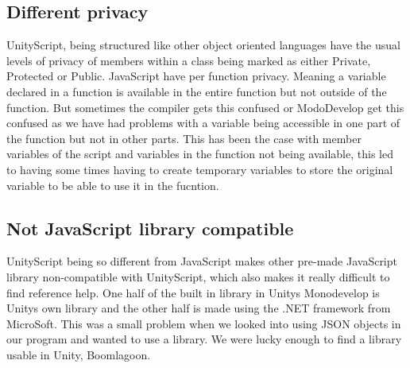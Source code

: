 \subsection {Different privacy}
UnityScript, being structured like other object oriented languages have the usual levels of privacy of members within a class being marked as either Private, Protected or Public. 
JavaScript have per function privacy. 
Meaning a variable declared in a function is available in the entire function but not outside of the function.
But sometimes the compiler gets this confused or ModoDevelop get this confused as we have had problems with a variable being accessible in one part of the function but not in other parts.
This has been the case with member variables of the script and variables in the function not being available, this led to having some times having to create temporary variables to store the original variable to be able to use it in the fucntion.
%

\subsection {Not JavaScript library compatible}
UnityScript being so different from JavaScript makes other pre-made JavaScript library non-compatible with UnityScript, which also makes it really difficult to find reference help. 
One half of the built in library in Unitys Monodevelop is Unitys own library and the other half is made using the .NET framework from MicroSoft.
This was a small problem when we looked into using JSON objects in our program and wanted to use a library.
We were lucky enough to find a library usable in Unity, Boomlagoon\cite{Boomlagoon.JSON}.
